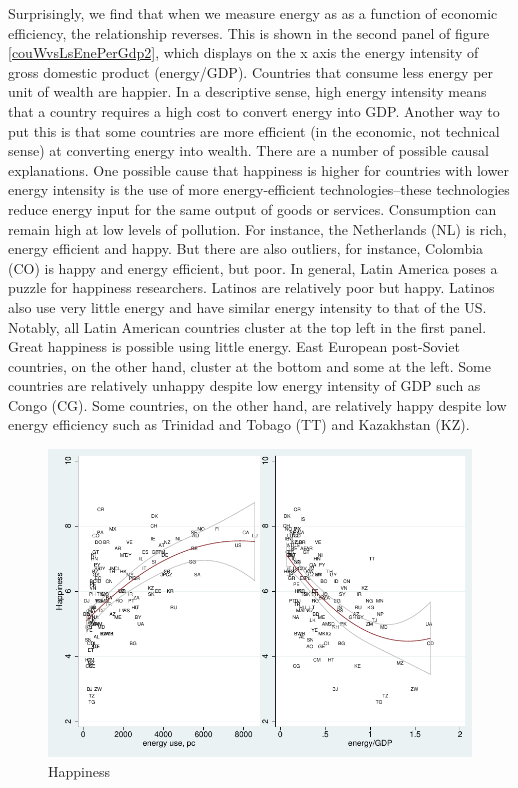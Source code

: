 \documentclass[10pt, letterpaper]{article}
\begin{document}
\begin{spacing}{1.4}
Surprisingly,  we find that when we measure energy as as a function of economic
efficiency, the relationship reverses.  This is shown in the second panel of
figure \ref{couWvsLsEnePerGdp2}, which displays on the x axis the energy intensity of gross domestic product (energy/GDP). Countries that consume less energy per unit of wealth are happier. 
%
In a descriptive sense, high energy intensity means that a country requires
a high cost to convert energy into GDP. Another way to put this is that some
countries are more efficient (in the economic, not technical sense) at
converting energy into wealth. There are a number of possible causal explanations. One possible cause that
happiness is higher for countries with lower energy intensity is the use
of more energy-efficient technologies--these technologies reduce energy input 
for the same output of goods or services. Consumption can remain high at low
levels of pollution.
 For instance,  the Netherlands (NL) is rich,  energy efficient and happy. But
 there are also outliers, for instance,  Colombia (CO) is  happy and energy
 efficient,  but poor.  
In general, Latin America poses a puzzle for happiness researchers. Latinos are
relatively poor but happy. Latinos also use very little  energy and have similar energy intensity to that of the  US. Notably, all Latin
 American countries cluster at the top left in the
first panel.  Great happiness is possible using little  energy. East European
post-Soviet countries, on the other hand, cluster at the bottom and some at the
left. Some countries are relatively unhappy despite low energy intensity of GDP such as Congo (CG). Some countries, on the other hand, are relatively happy
despite low energy efficiency such as Trinidad and Tobago (TT) and Kazakhstan (KZ).    
\begin{figure}[H]
 \includegraphics[width=6in]{graphsAndTables/couWdhEneGdp.pdf}\centering \caption{Happiness
}
\end{figure}
\end{spacing}
\end{document}
